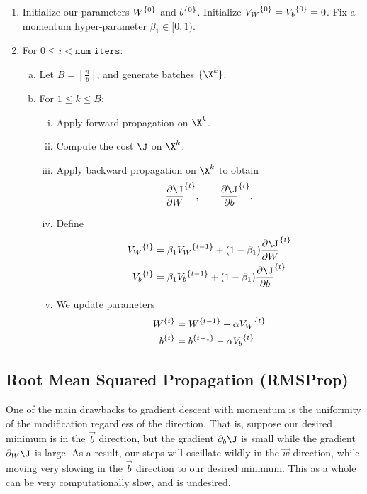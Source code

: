 \begin{enumerate}
	\item Initialize our parameters ${W}^{\{{0}\}}$ and ${b}^{\{{0}\}}$.  Initialize ${V_W}^{\{{0}\}}={V_b}^{\{{0}\}}=0$.  Fix a momentum hyper-parameter $\beta_1\in[0,1)$.
	\item For $0\leq i<\texttt{num\_iters}$:
	\begin{enumerate}[a.]
		\item Let $B=\left\lceil\frac{n}{b}\right\rceil$, and generate batches $\{\X^k\}$.
		\item For $1\leq k\leq B$:
		\begin{enumerate}[i.]
			\item Apply forward propagation on $\X^k$.
			\item Compute the cost $\J$ on $\X^k$.
			\item Apply backward propagation on $\X^k$ to obtain
			$$\iter{\frac{\partial\J}{\partial W}}{t},\qquad \iter{\frac{\partial\J}{\partial b}}{t}.$$
			\item Define
			\begin{align*}
				\iter{V_W}{t}&=\beta_1\iter{V_W}{t-1}+(1-\beta_1)\iter{\frac{\partial\J}{\partial W}}{t}\\
				\iter{V_b}{t}&=\beta_1\iter{V_b}{t-1}+(1-\beta_1)\iter{\frac{\partial\J}{\partial b}}{t}
			\end{align*}
			\item We update parameters
			\begin{align*}
				{W}^{\{{t}\}}&={W}^{\{{t-1}\}}-\alpha {V_W}^{\{{t}\}}\\
				{b}^{\{{t}\}}&={b}^{\{{t-1}\}}-\alpha{V_b}^{\{{t}\}}
			\end{align*}
		\end{enumerate}
	\end{enumerate}
\end{enumerate}




\subsection{Root Mean Squared Propagation (RMSProp)}
One of the main drawbacks to gradient descent with momentum is the uniformity of the modification regardless of the direction.  That is, suppose our desired minimum is in the $\vec{b}$ direction, but the gradient $\partial_b\J$ is small while the gradient $\partial_W\J$ is large.  As a result, our steps will oscillate wildly in the $\vec{w}$ direction, while moving very slowing in the $\vec{b}$ direction to our desired minimum.  This as a whole can be very computationally slow, and is undesired.

